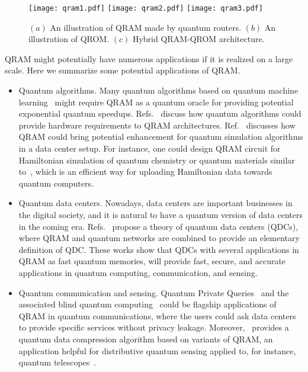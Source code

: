 \begin{figure}
    \centering
     \texttt{[image: qram1.pdf]}
     \texttt{[image: qram2.pdf]}
     \texttt{[image: qram3.pdf]}
    \caption{$(a)$ An illustration of QRAM made by quantum routers. $(b)$ An illustration of QROM. $(c)$ Hybrid QRAM-QROM architecture.}
    \label{fig:qram}
\end{figure}

QRAM might potentially have numerous applications if it is realized on a large scale. Here we summarize some potential applications of QRAM.
\begin{itemize}
\item Quantum algorithms. Many quantum algorithms based on quantum machine learning~\cite{wittek2014quantum,biamonte2017quantum} might require QRAM as a quantum oracle for providing potential exponential quantum speedups. Refs.~\cite{jiang2022quantum,liu2022quantum} discuss how quantum algorithms could provide hardware requirements to QRAM architectures. Ref.~\cite{liu2023data} discusses how QRAM could bring potential enhancement for quantum simulation algorithms in a data center setup. For instance, one could design QRAM circuit for Hamiltonian simulation of quantum chemistry or quantum materials similar to~\cite{babbush2018encoding}, which is an efficient way for uploading Hamiltonian data towards quantum computers. 

\item Quantum data centers. Nowadays, data centers are important businesses in the digital society, and it is natural to have a quantum version of data centers in the coming era. Refs.~\cite{liu2023data,liu2023quantum} propose a theory of quantum data centers (QDCs), where QRAM and quantum networks are combined to provide an elementary definition of QDC. These works show that QDCs with several applications in QRAM as fast quantum memories, will provide fast, secure, and accurate applications in quantum computing, communication, and sensing. 
\item Quantum communication and sensing. Quantum Private Queries~\cite{giovannetti2008queries} and the associated blind quantum computing~\cite{giovannetti2013efficient} could be flagship applications of QRAM in quantum communications, where the users could ask data centers to provide specific services without privacy leakage. Moreover,~\cite{liu2023data} provides a quantum data compression algorithm based on variants of QRAM, an application helpful for distributive quantum sensing applied to, for instance, quantum telescopes~\cite{gottesman2012longer}. 
\end{itemize}

